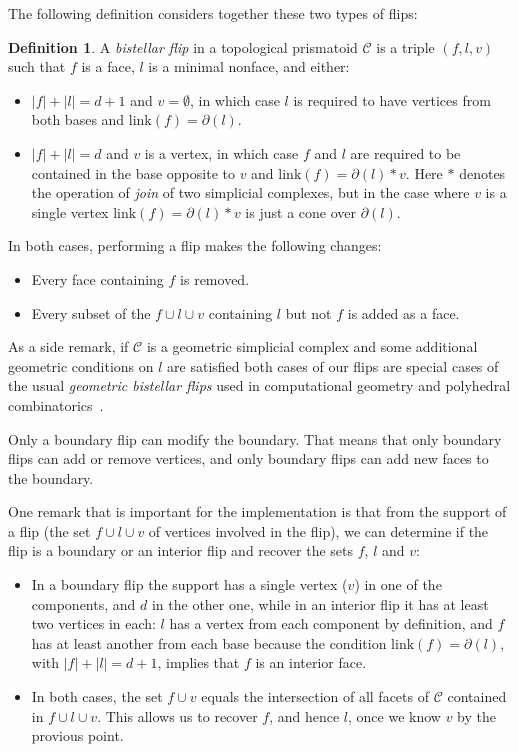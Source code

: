 \documentclass[12pt,a4paper]{article}
\theoremstyle{plain}
\theoremstyle{definition}
\newtheorem{definition}{Definition}
\begin{document}
The following definition considers together these two types of flips:

\begin{definition}
A \emph{bistellar flip} in a topological prismatoid $\mathcal{C}$ is a triple $(f,l,v)$ such that $f$ is a face, $l$ is a minimal nonface, and either:
\begin{itemize}
\item $|f|+|l|=d+1$ and $v=\emptyset$, in which case $l$ is required to have vertices from both bases and $\text{link}(f)=\partial(l)$.
\item $|f|+|l|=d$ and $v$ is a vertex, in which case $f$ and $l$ are required to be contained in the base opposite to $v$ and $\text{link}(f)=\partial(l)*v$. Here $*$ denotes the operation of \emph{join} of two simplicial complexes, but in the case where $v$ is a single vertex $\text{link}(f)=\partial(l)*v$ is just a cone over $\partial(l)$.
\end{itemize}
In both cases, performing a flip makes the following changes:
  \begin{itemize}
  \item Every face containing $f$ is removed.
  \item Every subset of the $f\cup l \cup v$ containing $l$ but not $f$ is added as a face.
\end{itemize}
\end{definition}

As a side remark, if $\mathcal{C}$ is a geometric simplicial complex and some additional geometric conditions on $l$ are satisfied both cases of our flips are special cases of the usual \emph{geometric bistellar flips} used in computational geometry and polyhedral combinatorics~\cite{SantosFlips}.

Only a boundary flip can modify the boundary. That means that only boundary flips can add or remove vertices, and only boundary flips can add new faces to the boundary. 

One remark that is important for the implementation is that from the support of a flip (the set $f\cup l \cup v$ of vertices involved in the flip), we can determine if the flip is a boundary or an interior flip and recover the sets $f$, $l$ and $v$:

\begin{itemize}
\item In a boundary flip the support has a single vertex ($v$) in one of the components, and $d$ in the other one, while in an interior flip it has at least two vertices in each: $l$ has a vertex from each component by definition, and $f$ has at least another from each base because the condition $\text{link}(f)=\partial(l)$, with $|f|+|l|=d+1$, implies that $f$ is an interior face.

\item In both cases, the set $f\cup v$ equals the intersection of all facets of $\mathcal{C}$ contained in $f\cup l \cup v$. This allows us to recover $f$, and hence $l$, once we know $v$ by the provious point.
\end{itemize}
\end{document}
